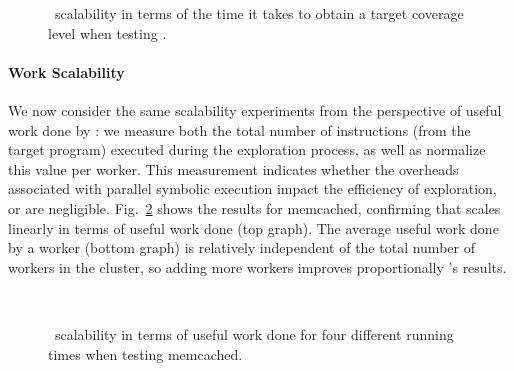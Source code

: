 \begin{figure}[h!]
  \centering
  \caption{\cnine\ scalability in terms of the time it takes to obtain a target coverage level when testing .}
  \label{fig:scalab-time-vs-workers-cov}
\end{figure}

\paragraph{Work Scalability} We now consider the same scalability experiments from the perspective of useful work done by \cnine: we measure both the total number of instructions (from the target program) executed during the exploration process, as well as normalize this value per worker. This measurement indicates whether the overheads associated with parallel symbolic execution impact the efficiency of exploration, or are negligible. Fig.~\ref{fig:scalab-memcached} shows the results for memcached, confirming that \cnine scales linearly in terms of useful work done (top graph).  The average useful work done by a worker (bottom graph) is relatively independent of the total number of workers in the cluster, so adding more workers improves proportionally \cnine's results.

\begin{figure}[t!]
  \centering
   \\
  \caption{\cnine\ scalability in terms of useful work done for four different running times when testing memcached.}
  \label{fig:scalab-memcached}
\end{figure}




